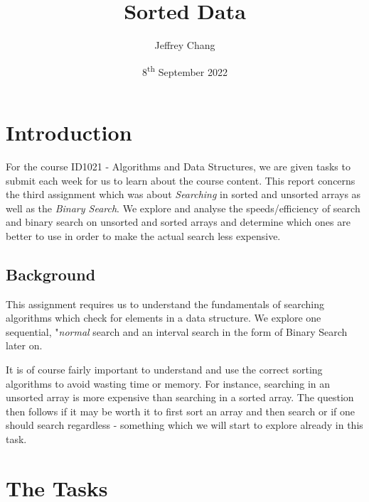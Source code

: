 \documentclass[a4paper,11pt]{article}
\begin{document}
\title{
    \textbf{Sorted Data}
}
\author{Jeffrey Chang}
\date{8\textsuperscript{th} September 2022}

\maketitle

\section*{Introduction}

For the course ID1021 - Algorithms and Data Structures, we are given tasks to submit each week for us to learn about the course content. This report concerns the third assignment which was about {\em Searching} in sorted and unsorted arrays as well as the {\em Binary Search}. We explore and analyse the speeds/efficiency of search and binary search on unsorted and sorted arrays and determine which ones are better to use in order to make the actual search less expensive.

\subsection*{Background}

This assignment requires us to understand the fundamentals of searching algorithms which check for elements in a data structure. We explore one sequential, "{\em normal} search and an interval search in the form of Binary Search later on.

It is of course fairly important to understand and use the correct sorting algorithms to avoid wasting time or memory. For instance, searching in an unsorted array is more expensive than searching in a sorted array. The question then follows if it may be worth it to first sort an array and then search or if one should search regardless - something which we will start to explore already in this task.

\section*{The Tasks}
\end{document}

